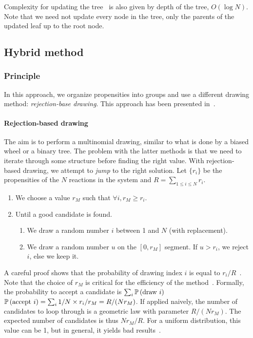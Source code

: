 Complexity for updating the tree~ is also given by depth of the tree, $O(\log N)$. Note that we need not update every node in the tree, only the parents of the updated leaf up to the root node.


\subsection {Hybrid method}

\subsubsection {Principle}

In this approach, we organize propensities into groups and use a different drawing method: \emph{rejection-base drawing}. This approach has been presented in~\citet{slepoy_constant-time_2008}.

\paragraph{Rejection-based drawing} The aim is to perform a multinomial drawing, similar to what is done by a biased wheel or a binary tree. The problem with the latter methods is that we need to iterate through some structure before finding the right value. With rejection-based drawing, we attempt to \emph{jump} to the right solution. Let $\{r_i\}$ be the propensities of the $N$ reactions in the system and $R = \sum_{1 \leq i \leq N} r_i$.
\begin{enumerate}
\item We choose a value $r_M$ such that $\forall i, r_M \geq r_i$.
\item Until a good candidate is found.
  \begin{enumerate}
  \item We draw a random number $i$ between 1 and $N$ (with replacement).
  \item We draw a random number $u$ on the $[0, r_M]$ segment. If $u > r_i$, we reject $i$, else we keep it.
  \end{enumerate}
\end{enumerate}

A careful proof shows that the probability of drawing index $i$ is equal to $r_i / R$~\citep{serebrinsky_physical_2011}. Note that the choice of $r_M$ is critical for the efficiency of the method~. Formally, the probability to accept a candidate is $\sum_i\mathbb{P}\left(\textrm{draw }i\right)$ $\mathbb{P}\left(\textrm{accept }i\right) = \sum_i1/N \times r_i/r_M = R/(Nr_M)$. If applied naively, the number of candidates to loop through is a geometric law with parameter $R/(Nr_M)$. The expected number of candidates is thus $Nr_M/R$. For a uniform distribution, this value can be 1, but in general, it yields bad results~.

